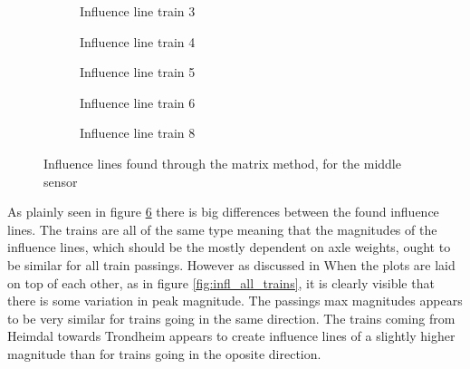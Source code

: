 \begin{figure}[H]
\centering
\begin{subfigure}[t]{0.4\textwidth}
	\centering
	
	\caption{Influence line train 3}
	\label{fig:train3}
\end{subfigure}
\qquad
\begin{subfigure}[t]{0.4\textwidth}
	\centering
	
	\caption{Influence line train 4}
	\label{fig:train4}
\end{subfigure}

\begin{subfigure}[t]{0.4\textwidth}
	\centering
	
	\caption{Influence line train 5}
	\label{fig:train5}
\end{subfigure}
\qquad
\begin{subfigure}[t]{0.4\textwidth}
	\centering
	
	\caption{Influence line train 6}
	\label{fig:train6}
\end{subfigure}

\begin{subfigure}[t]{0.9\textwidth}
	\centering
	
	\caption{Influence line train 8}
	\label{fig:train8}
\end{subfigure}
\caption{Influence lines found through the matrix method, for the middle sensor}
\label{fig:Influence_lines}
\end{figure}



As plainly seen in figure \ref{fig:Influence_lines} there is big differences between the found influence lines. The trains are all of the same type meaning that the magnitudes of the influence lines, which should be the mostly dependent on axle weights, ought to be similar for all train passings. However as discussed in   When the plots are laid on top of each other, as in figure \ref{fig:infl_all_trains}, it is clearly visible that there is some variation in peak magnitude. The passings max magnitudes appears to be very similar for trains going in the same direction. The trains coming from Heimdal towards Trondheim appears to create influence lines of a slightly higher magnitude than for trains going in the oposite direction.
